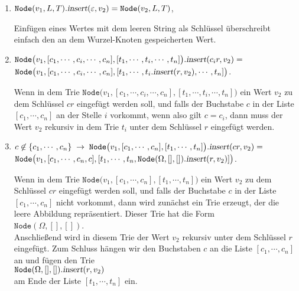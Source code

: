 \begin{enumerate}
\item $\texttt{Node}(v_1,L,T).\textsl{insert}(\varepsilon, v_2) = \texttt{Node}(v_2,L,T)$,

      Einf\"ugen eines Wertes mit dem leeren String als Schl\"ussel \"uberschreibt einfach
      den an dem Wurzel-Knoten gespeicherten Wert. 
\item $\texttt{Node}\bigl(v_1,[c_1,\cdots,c_i,\cdots,c_n], [t_1,\cdots,t_i,\cdots,t_n]\bigr).\textsl{insert}(c_ir,v_2) =$ \\[0.2cm]
      \hspace*{1.3cm}  
      $\texttt{Node}\bigl(v_1,[c_1,\cdots,c_i,\cdots,c_n], [t_1,\cdots,t_i.\textsl{insert}(r,v_2),\cdots,t_n]\bigr)$.

      Wenn in dem Trie $\texttt{Node}\bigl(v_1,[c_1,\cdots,c_i,\cdots,c_n], [t_1,\cdots,t_i,\cdots,t_n]\bigr)$ ein Wert
      $v_2$ zu dem Schl\"ussel $cr$ eingef\"ugt werden soll, und falls der Buchstabe $c$ in der Liste $[c_1,\cdots,c_n]$
      an der Stelle $i$ vorkommt, wenn also gilt $c= c_i$, dann muss der Wert $v_2$
      rekursiv in dem Trie $t_i$ unter dem Schl\"ussel 
      $r$ eingef\"ugt werden.

\item $c \not\in\{c_1,\cdots,c_n\} \;\rightarrow\;\texttt{Node}\bigl(v_1,[c_1,\cdots,c_n], [t_1,\cdots,t_n]\bigr).\textsl{insert}(cr,v_2) =$ \\[0.2cm]
      \hspace*{1.3cm}  
      $\texttt{Node}\bigl(v_1,[c_1,\cdots,c_n,c], [t_1,\cdots,t_n,\texttt{Node}(\Omega,[],[]).\textsl{insert}(r,v_2)]\bigr)$.
      
      Wenn in dem Trie $\texttt{Node}\bigl(v_1,[c_1,\cdots,c_n], [t_1,\cdots,t_n]\bigr)$
      ein Wert $v_2$ zu dem Schl\"ussel $cr$ eingef\"ugt werden soll, und falls der Buchstabe
      $c$ in der Liste $[c_1,\cdots,c_n]$ nicht vorkommt, dann wird zun\"achst ein Trie
      erzeugt, der die leere Abbildung repr\"asentiert.  Dieser Trie hat die Form \\[0.2cm]
      \hspace*{1.3cm} $\texttt{Node}(\Omega, [], [])$. \\[0.2cm]
      Anschlie{\ss}end wird in diesem Trie der Wert $v_2$ rekursiv unter dem Schl\"ussel $r$
      eingef\"ugt. Zum Schluss h\"angen wir den Buchstaben $c$ an die Liste $[c_1,\cdots,c_n]$      
      an und f\"ugen den Trie  \\[0.2cm] 
      \hspace*{1.3cm}
      $\texttt{Node}(\Omega, [], []).\textsl{insert}(r,v_2)$ 
      \\[0.2cm]
      am Ende der Liste $[t_1,\cdots,t_n]$ ein.
\end{enumerate}

